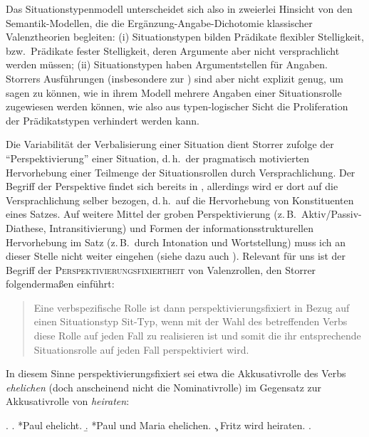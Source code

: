{Das Situationstypenmodell unterscheidet sich also in zweierlei Hinsicht von den Semantik-Modellen, die die Ergänzung-Angabe-Dichotomie klassischer Valenztheorien begleiten: (i) Situationstypen bilden Prädikate flexibler Stelligkeit, bzw.\ Prädikate fester Stelligkeit, deren Argumente aber nicht versprachlicht werden müssen; (ii) Situationstypen haben Argumentstellen für Angaben. Storrers Ausführungen (insbesondere zur ) sind aber nicht explizit genug, um sagen zu können, wie in ihrem Modell mehrere Angaben einer Situationsrolle zugewiesen werden können, wie also aus typen-logischer Sicht die Proliferation der Prädikatstypen verhindert werden kann.  %

Die Variabilität der Verbalisierung einer Situation dient Storrer zufolge der "`Perspektivierung"' einer Situation, d.\,h.\ der pragmatisch motivierten Hervorhebung einer Teilmenge der Situationsrollen durch Versprachlichung. Der Begriff der Perspektive findet sich bereits in \cite{Fillmore:77,Fillmore:77b}, allerdings wird er dort auf die Versprachlichung selber bezogen, d.\,h.\ auf die Hervorhebung von Konstituenten eines Satzes. Auf weitere Mittel der groben Perspektivierung (z.\,B.\ Aktiv/Passiv-Diathese, Intransitivierung) und Formen der informationsstrukturellen Hervorhebung im Satz (z.\,B.\ durch Intonation und Wortstellung) muss ich an dieser Stelle nicht weiter eingehen (siehe dazu auch \citealt[Kapitel~5]{Duerscheid:99}). Relevant für uns ist der Begriff der \textsc{Perspektivierungsfixiertheit} von Valenzrollen, den Storrer folgenderma\ss en einführt:

\begin{quote}
Eine verbspezifische Rolle ist dann perspektivierungsfixiert in Bezug auf einen Situationstyp Sit-Typ, wenn mit der Wahl des betreffenden Verbs diese Rolle auf jeden Fall zu realisieren ist und somit die ihr entsprechende Situationsrolle auf jeden Fall perspektiviert wird. \citep[285]{Storrer:92}
\end{quote}   
In diesem Sinne perspektivierungsfixiert sei etwa die Akkusativrolle des Verbs {\it ehelichen} (doch anscheinend nicht die Nominativrolle) im Gegensatz zur Akkusativrolle von {\it heiraten}:

\ex. \label{ex-storrer-285}
\a. \label{ex-storrer-285-a} *Paul ehelicht.
\b. \label{ex-storrer-285-b} *Paul und Maria ehelichen.
\c. Fritz wird heiraten.
\z. \citep[285]{Storrer:92}

}
